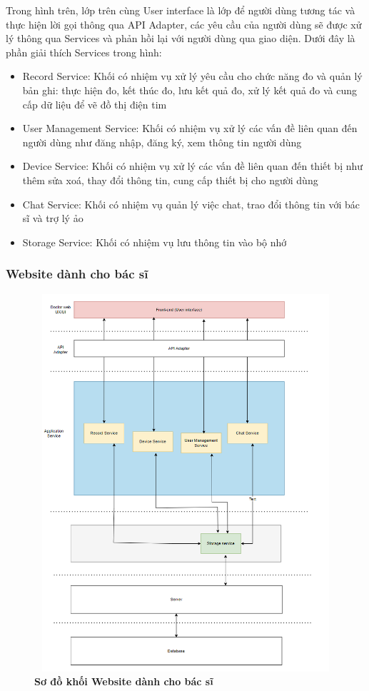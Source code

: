 Trong hình trên, lớp trên cùng User interface là lớp để người dùng tương tác và thực hiện lời gọi thông qua API Adapter, 
các yêu cầu của người dùng sẽ được xử lý thông qua Services và phản hồi lại với người dùng qua giao diện. Dưới đây là phần
giải thích Services trong hình:
\begin{adjustwidth}{1.5em}{}
\begin{itemize}
  \item Record Service: Khối có nhiệm vụ xử lý yêu cầu cho chức năng đo và quản lý bản ghi: thực hiện đo, kết thúc đo, lưu kết quả đo, xử lý kết quả đo và cung cấp dữ liệu để vẽ đồ thị điện tim
  \item User Management Service: Khối có nhiệm vụ xử lý các vấn đề liên quan đến người dùng như đăng nhập, đăng ký, xem thông tin người dùng
  \item Device Service: Khối có nhiệm vụ xử lý các vấn đề liên quan đến thiết bị như thêm sửa xoá, thay đổi thông tin, cung cấp thiết bị cho người dùng
  \item Chat Service: Khối có nhiệm vụ quản lý việc chat, trao đổi thông tin với bác sĩ và trợ lý ảo
  \item Storage Service: Khối có nhiệm vụ lưu thông tin vào bộ nhớ
\end{itemize}
\end{adjustwidth}


\subsubsection{Website dành cho bác sĩ}

\begin{figure}[H]
  \centering
  \includegraphics[width=12cm,height=14cm]{Images/system/fmECG_architecture-Doctors.drawio.png}
  \caption[Sơ đồ khối Website dành cho bác sĩ]{\bfseries \fontsize{12pt}{0pt}\selectfont Sơ đồ khối Website dành cho bác sĩ}
  \label{fmECG_architecture-Doctors} %
\end{figure}

